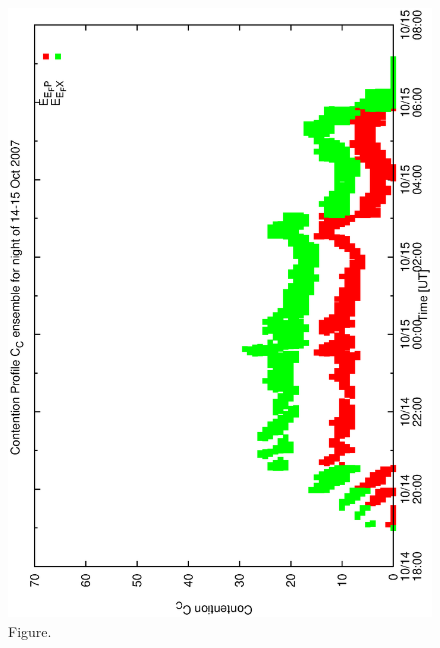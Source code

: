\documentclass[12pt,a4paper]{article}
\begin{document}
\begin{figure}[htbp]
 \begin{center}
  \includegraphics[scale=1.0, angle=0]{figures/cont6_ensemble.eps}
 \end{center}
  \caption[Figure.]
{Figure.}
\end{figure}
\clearpage
\end{document}
